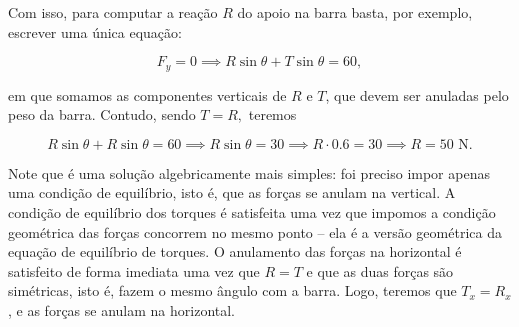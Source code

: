 \begin{exemplo}[Nível I]
\begin{enumerate}
Com isso, para computar a reação $R$ do apoio na barra basta, por exemplo, escrever uma única equação:

$$  F_y = 0 \implies R \sin \theta + T \sin \theta = 60,$$

\noindent em que somamos as componentes verticais de $R$ e $T$, que devem ser anuladas pelo peso da barra. Contudo, sendo $T=R,$ teremos 

$$  R \sin \theta + R \sin \theta = 60 \implies R \sin \theta = 30 \implies R \cdot 0.6 = 30 \implies \boxed{R=50 \text{ N}.}$$

Note que é uma solução algebricamente mais simples: foi preciso impor apenas uma condição de equilíbrio, isto é, que as forças se anulam na vertical. A condição de equilíbrio dos torques é satisfeita uma vez que impomos a condição geométrica das forças concorrem no mesmo ponto -- ela é a versão geométrica da equação de equilíbrio de torques. O anulamento das forças na horizontal é satisfeito de forma imediata uma vez que $R=T$ e que as duas forças são simétricas, isto é, fazem o mesmo ângulo com a barra. Logo, teremos que $T_x=R_x$, e as forças se anulam na horizontal.

    
\end{enumerate}




\end{exemplo}

\vspace{0.3cm}


